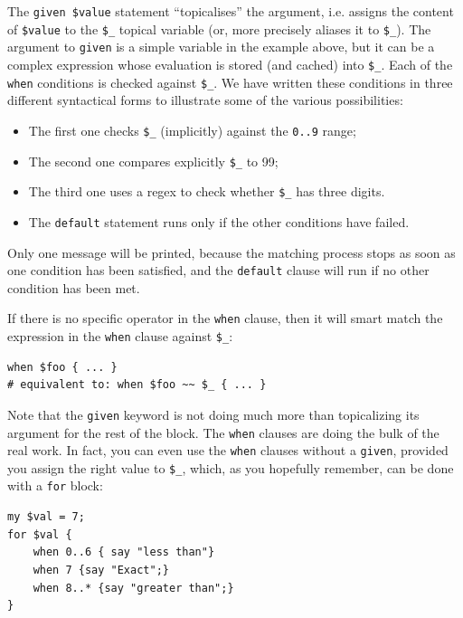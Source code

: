 The \verb'given $value' statement ``topicalises'' the argument, 
i.e. assigns the content of  \verb'$value' to the \verb'$_' 
topical variable (or, more precisely aliases it to \verb'$_'). 
The argument to {\tt given} is a simple variable in the 
example above, but it can be a complex expression whose 
evaluation is stored (and cached) into \verb'$_'. 
Each of the {\tt when} conditions is checked against \verb'$_'. 
We have written these conditions in three different syntactical 
forms to illustrate some of the various possibilities:
\begin{itemize}
\item The first one checks \verb'$_' (implicitly) against 
the \verb'0..9' range;
\item The second one compares explicitly \verb'$_' to 99;
\item The third one uses a regex to check whether \verb'$_' has 
three digits.
\item The \verb'default' statement runs only if the other 
conditions have failed.
\end{itemize}

Only one message will be printed, because the 
matching process stops as soon as one condition has been 
satisfied, and the \verb'default' clause will run if 
no other condition has been met.

If there is no specific operator in the {\tt when} clause, 
then it will smart match the expression in the {\tt when} 
clause against \verb'$_':

\begin{verbatim}
when $foo { ... }
# equivalent to: when $foo ~~ $_ { ... }
\end{verbatim}

Note that the {\tt given} keyword is not doing much more than 
topicalizing its argument for the rest of the block. 
The {\tt when} clauses are doing the bulk of the real work. In fact, 
you can even use the {\tt when} clauses without a {\tt given}, 
provided you assign the right value to \verb'$_', which, as you 
hopefully remember, can be done with a {\tt for} block:

\begin{verbatim}
my $val = 7;
for $val { 
    when 0..6 { say "less than"}
    when 7 {say "Exact";} 
    when 8..* {say "greater than";}
}
\end{verbatim}

